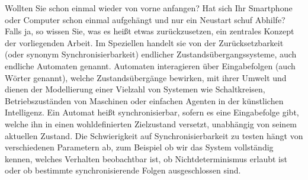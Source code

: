 



Wollten Sie schon einmal wieder von vorne anfangen? Hat sich Ihr Smartphone %
oder Computer schon einmal aufgehängt %
und nur ein Neustart schuf Abhilfe? Falls ja, so wissen Sie, was es heißt etwas zurückzusetzen, ein zentrales Konzept
der vorliegenden Arbeit.
Im Speziellen handelt sie von der Zurücksetzbarkeit (oder synonym Synchronisierbarkeit) endlicher Zustandsübergangssysteme, auch endliche Automaten genannt.
Automaten interagieren über Eingabefolgen (auch Wörter genannt), welche Zustandsübergänge bewirken, mit ihrer Umwelt
und dienen der Modellierung einer Vielzahl von Systemen wie Schalt\-kreisen, 
Betriebszuständen von Maschinen oder einfachen Agenten in der künstlichen Intelligenz.
%
Ein Automat heißt synchronisierbar, sofern
es eine Eingabefolge gibt, welche
ihn in einen wohldefinierten Zielzustand versetzt, unabhängig von seinem aktuellen Zustand.
Die Schwierigkeit auf Synchronisierbarkeit zu testen %
hängt von verschiedenen Parametern ab, zum Beispiel
ob wir das System vollständig kennen, welches Verhalten beobachtbar ist,
ob Nichtdeterminismus erlaubt ist oder ob bestimmte synchronisierende Folgen ausgeschlossen sind.


